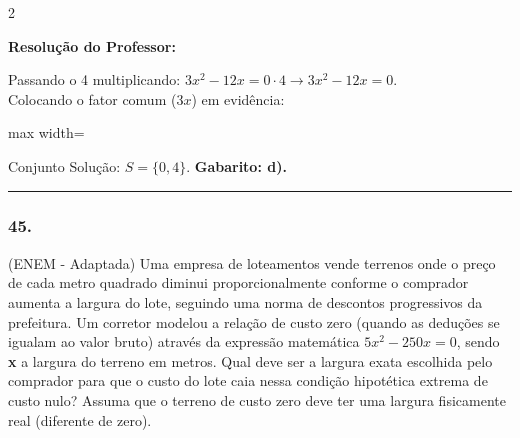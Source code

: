 \begin{multicols*}{2}
\ifgabarito
    \begin{tcolorbox}[colback=CorTitUm!5, colframe=CorTitUm, boxrule=1pt, arc=4pt, left=6pt, right=6pt, top=6pt, bottom=6pt]
    \small\textbf{\textcolor{CorTitUm}{Resolução do Professor:}}\par\vspace{0.1cm}
    \color{CinzaEscuro}
    Passando o 4 multiplicando: $3x^2 - 12x = 0 \cdot 4 \rightarrow 3x^2 - 12x = 0$.\\
    Colocando o fator comum ($3x$) em evidência:\\
    \begin{center}
    \begin{adjustbox}{max width=\linewidth}
    \end{adjustbox}
    \end{center}
    Conjunto Solução: $S = \{0, 4\}$. \textbf{Gabarito: d).}
    \end{tcolorbox}
\fi

\par\vspace{\espacoQuestao}

\noindent\textcolor{CorLinha}{\rule{\linewidth}{0.5pt}} 
\par\vspace{\espacoPreQuestao}
\subsubsection*{45.} (ENEM - Adaptada) Uma empresa de loteamentos vende terrenos onde o preço de cada metro quadrado diminui proporcionalmente conforme o comprador aumenta a largura do lote, seguindo uma norma de descontos progressivos da prefeitura. Um corretor modelou a relação de custo zero (quando as deduções se igualam ao valor bruto) através da expressão matemática $ 5x^2 - 250x = 0 $, sendo \textbf{x} a largura do terreno em metros. Qual deve ser a largura exata escolhida pelo comprador para que o custo do lote caia nessa condição hipotética extrema de custo nulo? Assuma que o terreno de custo zero deve ter uma largura fisicamente real (diferente de zero).


\end{multicols*}
